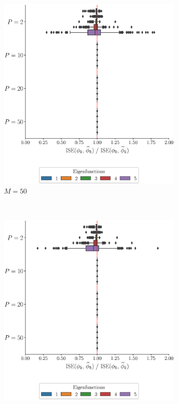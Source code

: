 \begin{results}
\begin{figure}
\begin{subfigure}[b]{0.49\textwidth}
         \includegraphics[width=\textwidth]{figures/scenario_1/ise_N50_M50.eps}
         \caption{$M = 50$}
         \label{fig:ise_mfd_1d_50}
     \end{subfigure}
     \\
     \begin{subfigure}[b]{0.49\textwidth}
         \centering
         \includegraphics[width=\textwidth]{figures/scenario_1/ise_N50_M75.eps}

\end{subfigure}
\end{figure}
\end{results}
